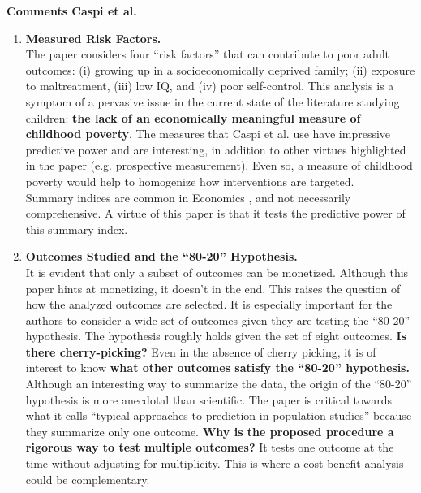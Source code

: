 



\doublespacing

\noindent \textbf{Comments Caspi et al.}\\

\noindent

\begin{enumerate}

\item \textbf{Measured Risk Factors.}\\
\noindent The paper considers four ``risk factors'' that can contribute to poor adult outcomes: (i) growing up in a socioeconomically deprived family; (ii) exposure to maltreatment, (iii) low IQ, and (iv) poor self-control. This analysis is a symptom of a pervasive issue in the current state of the literature studying children: \textbf{the lack of an economically meaningful measure of childhood poverty}. The measures that Caspi et al. use have impressive predictive power and are interesting, in addition to other virtues highlighted in the paper (e.g. prospective measurement). Even so, a measure of childhood poverty would help to homogenize how interventions are targeted. \\

\noindent Summary indices are common in Economics \citep[e.g.][]{Kline_Walters_2016_QJE}, and not necessarily comprehensive. A virtue of this paper is that it tests the predictive power of this summary index.\\

\item \textbf{Outcomes Studied and the ``80-20'' Hypothesis.}\\
\noindent It is evident that only a subset of outcomes can be monetized. Although this paper hints at monetizing, it doesn't in the end. This raises the question of how the analyzed outcomes are selected. It is especially important for the authors to consider a wide set of outcomes given they are testing the ``80-20'' hypothesis. The hypothesis roughly holds given the set of eight outcomes. \textbf{Is there cherry-picking?} Even in the absence of cherry picking, it is of interest to know \textbf{what other outcomes satisfy the ``80-20'' hypothesis.} \\

\noindent Although an interesting way to summarize the data, the origin of the ``80-20'' hypothesis is more anecdotal than scientific. The paper is critical towards what it calls ``typical approaches to prediction in population studies'' because they summarize only one outcome. \textbf{Why is the proposed procedure a rigorous way to test multiple outcomes?} It tests one outcome at the time without adjusting for multiplicity. This is where a cost-benefit analysis could be complementary. \\


\end{enumerate}
